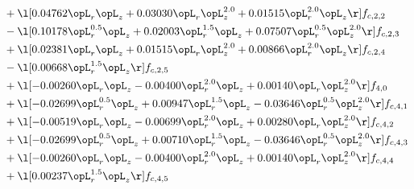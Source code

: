 \begin{alignat}{2}
& + \l[  0.04762 \opL_r \opL_z +  0.03030 \opL_r \opL_z^{2.0} +  0.01515 \opL_r^{2.0} \opL_z  \r] f_{c,2,2} \nonumber \\ 
& - \l[  0.10178 \opL_r^{0.5} \opL_z +  0.02003 \opL_r^{1.5} \opL_z +  0.07507 \opL_r^{0.5} \opL_z^{2.0}  \r] f_{c,2,3} \nonumber \\ 
& + \l[  0.02381 \opL_r \opL_z +  0.01515 \opL_r \opL_z^{2.0} +  0.00866 \opL_r^{2.0} \opL_z  \r] f_{c,2,4} \nonumber \\ 
& - \l[  0.00668 \opL_r^{1.5} \opL_z  \r] f_{c,2,5} \nonumber \\ 
& + \l[  -0.00260 \opL_r \opL_z   -0.00400 \opL_r^{2.0} \opL_z +  0.00140 \opL_r \opL_z^{2.0}  \r] f_{4,0} \nonumber \\ 
& + \l[  -0.02699 \opL_r^{0.5} \opL_z +  0.00947 \opL_r^{1.5} \opL_z   -0.03646 \opL_r^{0.5} \opL_z^{2.0}  \r] f_{c,4,1} \nonumber \\ 
& + \l[  -0.00519 \opL_r \opL_z   -0.00699 \opL_r^{2.0} \opL_z +  0.00280 \opL_r \opL_z^{2.0}  \r] f_{c,4,2} \nonumber \\ 
& + \l[  -0.02699 \opL_r^{0.5} \opL_z +  0.00710 \opL_r^{1.5} \opL_z   -0.03646 \opL_r^{0.5} \opL_z^{2.0}  \r] f_{c,4,3} \nonumber \\ 
& + \l[  -0.00260 \opL_r \opL_z   -0.00400 \opL_r^{2.0} \opL_z +  0.00140 \opL_r \opL_z^{2.0}  \r] f_{c,4,4} \nonumber \\ 
& + \l[  0.00237 \opL_r^{1.5} \opL_z  \r] f_{c,4,5} \nonumber \\ 
\end{alignat} 


